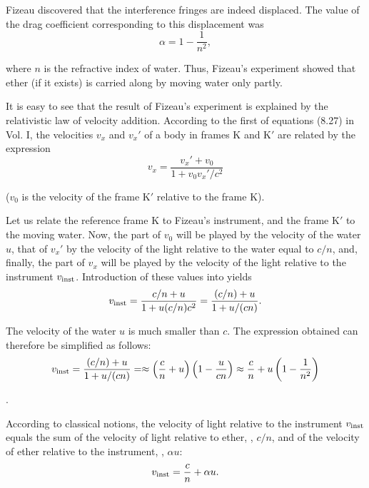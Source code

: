 Fizeau discovered that the interference fringes are indeed displaced.
The value of the drag coefficient corresponding to this displacement was
\begin{equation}\label{eq:21_3}
	\alpha = 1 - \frac{1}{n^2},
\end{equation}

\noindent
where $n$ is the refractive index of water.
Thus, Fizeau's experiment showed that ether (if it exists) is carried along by moving water only partly.

It is easy to see that the result of Fizeau's experiment is explained by the relativistic law of velocity addition.
According to the first of equations (8.27) in Vol. I, the velocities $v_x$ and $v_x'$ of a body in frames K and K$'$ are related by the expression
\begin{equation}\label{eq:21_4}
	v_x = \frac{v_x' + v_0}{1 + v_0 v_x'/c^2}
\end{equation}

\noindent
($v_0$ is the velocity of the frame K$'$ relative to the frame K).

Let us relate the reference frame K to Fizeau's instrument, and the frame K$'$ to the moving water.
Now, the part of $v_0$ will be played by the velocity of the water $u$, that of $v_x'$ by the velocity of the light relative to the water equal to $c/n$, and, finally, the part of $v_x$ will be played by the velocity of the light relative to the instrument $v_{\text{inst}}$.
Introduction of these values into  yields
\begin{equation*}
	v_{\text{inst}} = \frac{c/n + u}{1 + u(c/n)c^2} = \frac{(c/n) + u}{1 + u/(cn)}.
\end{equation*}

\noindent
The velocity of the water $u$ is much smaller than $c$.
The expression obtained can therefore be simplified as follows:
\begin{equation}\label{eq:21_5}
	v_{\text{inst}} = \frac{(c/n) + u}{1 + u/(cn)} = \approx \left(\frac{c}{n}+u\right) \left(1 - \frac{u}{cn}\right) \approx \frac{c}{n} + u \left(1 - \frac{1}{n^2}\right)
\end{equation}

.

According to classical notions, the velocity of light relative to the instrument $v_{\text{inst}}$ equals the sum of the velocity of light relative to ether, \ie, $c/n$, and of the velocity of ether relative to the instrument, \ie, $\alpha u$:
\begin{equation*}
	v_{\text{inst}} = \frac{c}{n} + \alpha u.
\end{equation*}

